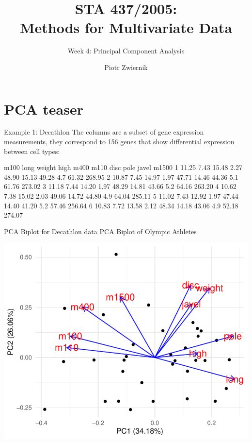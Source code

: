 \documentclass[11pt,handout,aspectratio=169]{beamer}
\title[STA437-Week1]{STA 437/2005: \\ Methods for Multivariate Data}
\subtitle[]{Week 4: Principal Component Analysis}
\author[Prob Learning]{Piotr Zwiernik}
\institute[UofT]{University of Toronto}
\date{}
\begin{document}


\maketitle




\section{PCA teaser}



\begin{frame}[fragile]{Example 1: Decathlon}
The columns are a subset of gene expression measurements, they correspond to 156 genes that show differential expression between cell types:
\scriptsize
\begin{Schunk}
\begin{Soutput}
   m100 long weight high  m400  m110  disc pole javel  m1500
1 11.25 7.43  15.48 2.27 48.90 15.13 49.28  4.7 61.32 268.95
2 10.87 7.45  14.97 1.97 47.71 14.46 44.36  5.1 61.76 273.02
3 11.18 7.44  14.20 1.97 48.29 14.81 43.66  5.2 64.16 263.20
4 10.62 7.38  15.02 2.03 49.06 14.72 44.80  4.9 64.04 285.11
5 11.02 7.43  12.92 1.97 47.44 14.40 41.20  5.2 57.46 256.64
6 10.83 7.72  13.58 2.12 48.34 14.18 43.06  4.9 52.18 274.07
\end{Soutput}
\end{Schunk}
\end{frame}


\begin{frame}[fragile]{PCA Biplot for Decathlon data}
PCA Biplot of Olympic Athletes	{\scriptsize
\begin{center}
\includegraphics[width=.6\textwidth]{pics/plot4.1.pdf}		
\end{center}}
\end{frame}
\end{document}
